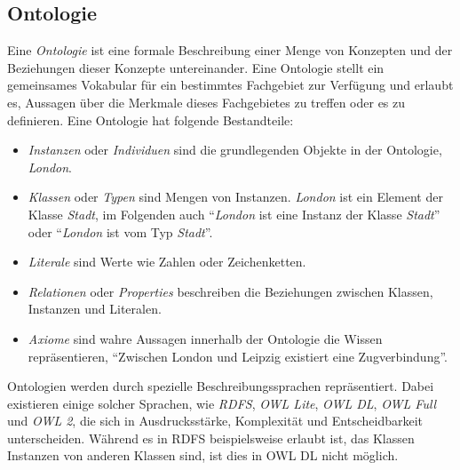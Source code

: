 \subsection{Ontologie}
Eine \textit{Ontologie} ist eine formale Beschreibung einer Menge von Konzepten und der Beziehungen dieser Konzepte untereinander.
Eine Ontologie stellt ein gemeinsames Vokabular für ein bestimmtes Fachgebiet zur Verfügung und erlaubt es, Aussagen über die Merkmale dieses Fachgebietes zu treffen oder es zu definieren. 
Eine Ontologie hat folgende Bestandteile:
\begin{itemize}
\item \emph{Instanzen} oder \emph{Individuen} sind die grundlegenden Objekte in der Ontologie, \zb{} \emph{London}.
\item \emph{Klassen} oder \emph{Typen} sind Mengen von Instanzen. \emph{London} ist ein Element der Klasse \emph{Stadt},
im Folgenden auch "`\emph{London} ist eine Instanz der Klasse \emph{Stadt}"' oder "`\emph{London} ist vom Typ \emph{Stadt}"'.
\item \emph{Literale} sind Werte wie Zahlen oder Zeichenketten.
\item \emph{Relationen} oder \emph{Properties} beschreiben die Beziehungen zwischen Klassen, Instanzen und Literalen.
\item \emph{Axiome} sind wahre Aussagen innerhalb der Ontologie die Wissen repräsentieren, \zb{} "`Zwischen London und Leipzig existiert eine Zugverbindung"'.
\end{itemize}

Ontologien werden durch spezielle Beschreibungssprachen repräsentiert. 
Dabei existieren einige solcher Sprachen, wie \textit{RDFS}, \emph{OWL Lite}, \emph{OWL DL}, \emph{OWL Full} und \textit{OWL 2}, die sich in Ausdrucksstärke, Komplexität und Entscheidbarkeit unterscheiden.
Während es in RDFS beispielsweise erlaubt ist, das Klassen Instanzen von anderen Klassen sind, ist dies in OWL DL nicht möglich.

